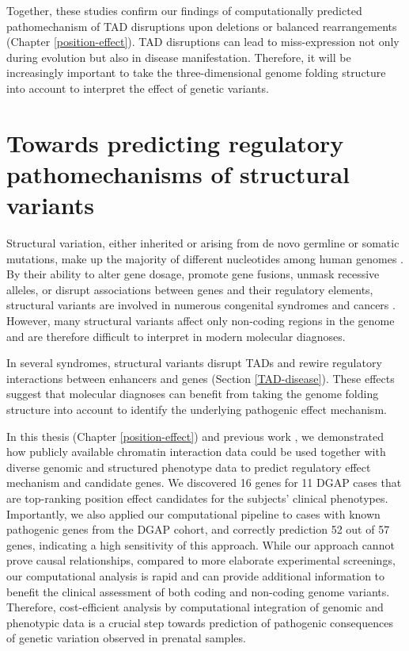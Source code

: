 \documentclass[a4paper,twoside=true,openright,parskip=full,chapterprefix=true,11pt,headings=normal,bibliography=totoc,listof=totoc,titlepage=on,captions=tableabove,draft=false]{scrreprt}
\theoremstyle{definition}
\theoremstyle{definition}
\theoremstyle{definition}
\theoremstyle{remark}
\begin{document}
Together, these studies confirm our findings of computationally
predicted pathomechanism of TAD disruptions upon deletions
\citep{Ibn-Salem2014} or balanced rearrangements (Chapter
\ref{position-effect}). TAD disruptions can lead to miss-expression not
only during evolution but also in disease manifestation. Therefore, it
will be increasingly important to take the three-dimensional genome
folding structure into account to interpret the effect of genetic
variants.

\hypertarget{towards-predicting-regulatory-pathomechanisms-of-structural-variants}{%
\section{Towards predicting regulatory pathomechanisms of structural
variants}\label{towards-predicting-regulatory-pathomechanisms-of-structural-variants}}

Structural variation, either inherited or arising from de novo germline
or somatic mutations, make up the majority of different nucleotides
among human genomes \citep{Sudmant2015, Auton2015}. By their ability to
alter gene dosage, promote gene fusions, unmask recessive alleles, or
disrupt associations between genes and their regulatory elements,
structural variants are involved in numerous congenital syndromes and
cancers \citep{Stankiewicz2010}. However, many structural variants
affect only non-coding regions in the genome and are therefore difficult
to interpret in modern molecular diagnoses.

In several syndromes, structural variants disrupt TADs and rewire
regulatory interactions between enhancers and genes (Section
\ref{TAD-disease}). These effects suggest that molecular diagnoses can
benefit from taking the genome folding structure into account to
identify the underlying pathogenic effect mechanism.

In this thesis (Chapter \ref{position-effect}) and previous work
\citep{Ibn-Salem2014}, we demonstrated how publicly available chromatin
interaction data could be used together with diverse genomic and
structured phenotype data to predict regulatory effect mechanism and
candidate genes. We discovered 16 genes for 11 DGAP cases that are
top-ranking position effect candidates for the subjects' clinical
phenotypes. Importantly, we also applied our computational pipeline to
cases with known pathogenic genes from the DGAP cohort, and correctly
prediction 52 out of 57 genes, indicating a high sensitivity of this
approach. While our approach cannot prove causal relationships, compared
to more elaborate experimental screenings, our computational analysis is
rapid and can provide additional information to benefit the clinical
assessment of both coding and non-coding genome variants. Therefore,
cost-efficient analysis by computational integration of genomic and
phenotypic data is a crucial step towards prediction of pathogenic
consequences of genetic variation observed in prenatal samples.
\end{document}
